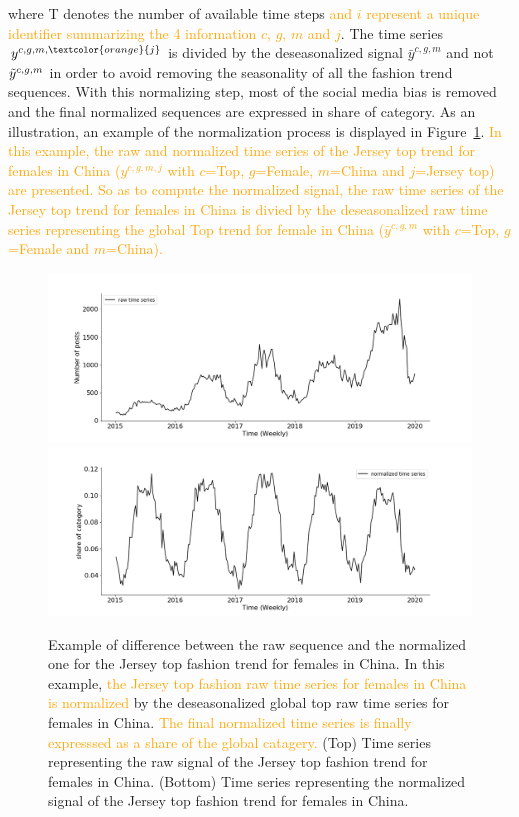 \documentclass[10pt]{article} %
\begin{document}
where T denotes the number of available time steps \textcolor{orange}{and $i$ represent a unique identifier summarizing the 4 information $c$, $g$, $m$ and $j$}. The time series $y^{c,g,m,\textcolor{orange}{j}}$ is divided by the deseasonalized signal $\bar{y}^{c,g,m}$ and not $\Tilde{y}^{c,g,m}$ in order to avoid removing the seasonality of all the fashion trend sequences. With this normalizing step, most of the social media bias is removed and the final normalized sequences are expressed in share of category. As an illustration, an example of the normalization process is displayed in Figure~\ref{fig:normalization}. \textcolor{orange}{In this example, the raw and normalized time series of the Jersey top trend for females in China ($y^{c,g,m,j}$ with $c$=Top, $g$=Female, $m$=China and $j$=Jersey top) are presented. So as to compute the normalized signal, the raw time series of the Jersey top trend for females in China is divied by the deseasonalized raw time series representing the global Top trend for female in China ($\bar{y}^{c,g,m}$ with $c$=Top, $g$=Female and $m$=China).}

\begin{figure}
\centering
  \includegraphics[width=1.\linewidth]{cn_female_top_raw}
  \includegraphics[width=1.\linewidth]{cn_female_top_norm}
\caption{Example of difference between the raw sequence and the normalized one for the Jersey top fashion trend for females in China. In this example, \textcolor{orange}{the Jersey top fashion raw time series for females in China is normalized} by the deseasonalized global top raw time series for females in China. \textcolor{orange}{The final normalized time series is finally expresssed as a share of the global catagery.} (Top) Time series representing the raw signal of the Jersey top fashion trend for females in China. (Bottom) Time series representing the normalized signal of the Jersey top fashion trend for females in China.}
\label{fig:normalization}
\end{figure}
\end{document}

